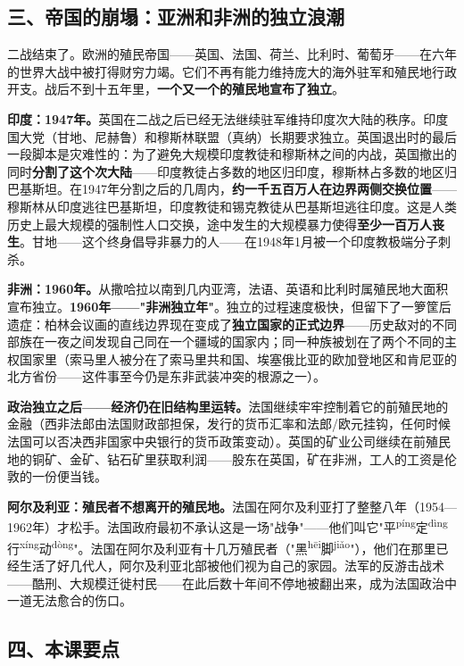 \documentclass[a4paper,12pt]{ctexart}
\newcommand{\ruby}[2]{#1\textsuperscript{#2}}
\begin{document}
\subsection*{三、帝国的崩塌：亚洲和非洲的独立浪潮}

二战结束了。欧洲的殖民帝国——英国、法国、荷兰、比利时、葡萄牙——在六年的世界大战中被打得财穷力竭。它们不再有能力维持庞大的海外驻军和殖民地行政开支。战后不到十五年里，\textbf{一个又一个的殖民地宣布了独立}。

\textbf{印度：1947年。}英国在二战之后已经无法继续驻军维持印度次大陆的秩序。印度国大党（甘地、尼赫鲁）和穆斯林联盟（真纳）长期要求独立。英国退出时的最后一段脚本是灾难性的：为了避免大规模印度教徒和穆斯林之间的内战，英国撤出的同时\textbf{分割了这个次大陆}——印度教徒占多数的地区归印度，穆斯林占多数的地区归巴基斯坦。在1947年分割之后的几周内，\textbf{约一千五百万人在边界两侧交换位置}——穆斯林从印度逃往巴基斯坦，印度教徒和锡克教徒从巴基斯坦逃往印度。这是人类历史上最大规模的强制性人口交换，途中发生的大规模暴力使得\textbf{至少一百万人丧生}。甘地——这个终身倡导非暴力的人——在1948年1月被一个印度教极端分子刺杀。

\textbf{非洲：1960年。}从撒哈拉以南到几内亚湾，法语、英语和比利时属殖民地大面积宣布独立。\textbf{1960年——"非洲独立年"}。独立的过程速度极快，但留下了一箩筐后遗症：柏林会议画的直线边界现在变成了\textbf{独立国家的正式边界}——历史敌对的不同部族在一夜之间发现自己同在一个疆域的国家内；同一种族被划在了两个不同的主权国家里（索马里人被分在了索马里共和国、埃塞俄比亚的欧加登地区和肯尼亚的北方省份——这件事至今仍是东非武装冲突的根源之一）。

\textbf{政治独立之后——经济仍在旧结构里运转。}法国继续牢牢控制着它的前殖民地的金融（西非法郎由法国财政部担保，发行的货币汇率和法郎/欧元挂钩，任何时候法国可以否决西非国家中央银行的货币政策变动）。英国的矿业公司继续在前殖民地的铜矿、金矿、钻石矿里获取利润——股东在英国，矿在非洲，工人的工资是伦敦的一份便当钱。

\textbf{阿尔及利亚：殖民者不想离开的殖民地。}法国在阿尔及利亚打了整整八年（1954—1962年）才松手。法国政府最初不承认这是一场"战争"——他们叫它"\ruby{平}{píng}\ruby{定}{dìng}\ruby{行}{xíng}\ruby{动}{dòng}"。法国在阿尔及利亚有十几万殖民者（"\ruby{黑}{hēi}\ruby{脚}{jiǎo}"），他们在那里已经生活了好几代人，阿尔及利亚北部被他们视为自己的家园。法军的反游击战术——酷刑、大规模迁徙村民——在此后数十年间不停地被翻出来，成为法国政治中一道无法愈合的伤口。

\subsection*{四、本课要点}
\end{document}
